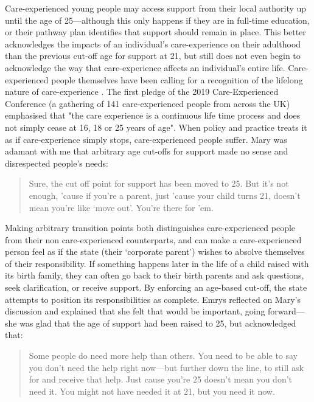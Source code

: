 Care-experienced young people may access support from their local authority up until the age of 25—although this only happens if they are in full-time education, or their pathway plan identifies that support should remain in place.  This better acknowledges the impacts of an individual’s care-experience on their adulthood than the previous cut-off age for support at 21, but still does not even begin to acknowledge the way that care-experience affects an individual's entire life.  Care-experienced people themselves have been calling for a recognition of the lifelong nature of care-experience \citep{the_care_experienced_conference_care_2019}. The first pledge of the 2019 Care-Experienced Conference (a gathering of 141 care-experienced people from across the UK) emphasised that "the care experience is a continuous life time process and does not simply cease at 16, 18 or 25 years of age". When policy and practice treats it as if care-experience simply stops, care-experienced people suffer. Mary was adamant with me that arbitrary age cut-offs for support made no sense and disrespected people's needs:
\begin{quote}
Sure, the cut off point for support has been moved to 25. But it's not enough, 'cause if you're a parent, just 'cause your child turns 21, doesn't mean you're like `move out'. You're there for 'em.
\end{quote}
Making arbitrary transition points both distinguishes care-experienced people from their non care-experienced counterparts, and can make a care-experienced person feel as if the state (their ‘corporate parent’) wishes to absolve themselves of their responsibility. If something happens later in the life of a child raised with its birth family, they can often go back to their birth parents and ask questions, seek clarification, or receive support. By enforcing an age-based cut-off, the state attempts to position its responsibilities as complete. Emrys reflected on Mary's discussion and explained that she felt that would be important, going forward—she was glad that the age of support had been raised to 25, but acknowledged that:
\begin{quote}
Some people do need more help than others. You need to be able to say you don't need the help right now—but further down the line, to still ask for and receive that help. Just cause you're 25 doesn't mean you don't need it. You might not have needed it at 21, but you need it now.
\end{quote}
